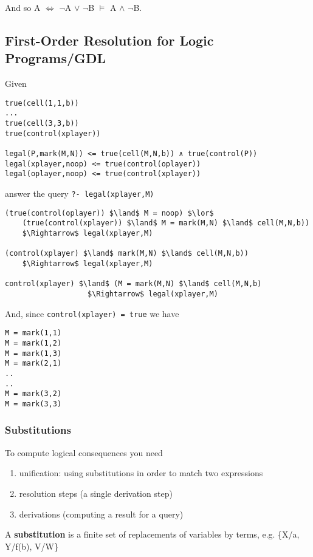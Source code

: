 And so A $\Leftrightarrow$ $\neg$A $\lor$ $\neg$B $\models$ A $\land$ $\neg$B.

\subsection{First-Order Resolution for Logic Programs/GDL}
Given
\begin{lstlisting}
true(cell(1,1,b))
...
true(cell(3,3,b))
true(control(xplayer))

legal(P,mark(M,N)) <= true(cell(M,N,b)) ∧ true(control(P))
legal(xplayer,noop) <= true(control(oplayer))
legal(oplayer,noop) <= true(control(xplayer))
\end{lstlisting}

answer the query \verb|?- legal(xplayer,M)|

\begin{lstlisting}
(true(control(oplayer)) $\land$ M = noop) $\lor$
    (true(control(xplayer)) $\land$ M = mark(M,N) $\land$ cell(M,N,b))
    $\Rightarrow$ legal(xplayer,M)

(control(xplayer) $\land$ mark(M,N) $\land$ cell(M,N,b))
    $\Rightarrow$ legal(xplayer,M)

control(xplayer) $\land$ (M = mark(M,N) $\land$ cell(M,N,b)
                   $\Rightarrow$ legal(xplayer,M)
\end{lstlisting}

And, since \verb|control(xplayer) = true| we have

\begin{lstlisting}
M = mark(1,1)
M = mark(1,2)
M = mark(1,3)
M = mark(2,1)
..
..
M = mark(3,2)
M = mark(3,3)
\end{lstlisting}

\subsubsection{Substitutions}
To compute logical consequences you need
\begin{enumerate}
    \item unification: using substitutions in order to match two expressions
    \item resolution steps (a single derivation step)
    \item derivations (computing a result for a query)
\end{enumerate}

A \textbf{substitution} is a finite set of replacements of variables by terms,
e.g. \{X/a, Y/f(b), V/W\}

